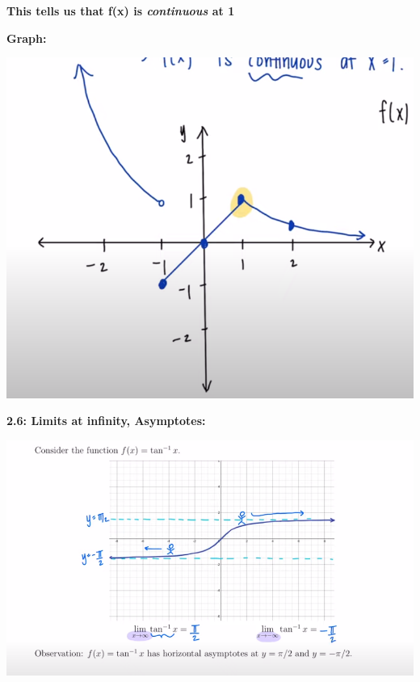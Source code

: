 \documentclass{report}
\begin{document}
        \bigbreak \noindent 
        \textbf{This tells us that f(x) is \textbf{\textit{continuous}} at \textbf{1}}

        \bigbreak \noindent \bigbreak \noindent 
        \begin{large}
            \textbf{Graph:}
        \end{large}

        \bigbreak \noindent \bigbreak \noindent 
        \begin{center}
            \includegraphics[scale=0.4]{../images/10.png}
        \end{center}


        \pagebreak \bigbreak \noindent
        \begin{Large}
            \textbf{2.6: Limits at infinity, Asymptotes:}
        \end{Large}

        \bigbreak \noindent \bigbreak \noindent \bigbreak \noindent 
        \begin{center}
            \includegraphics[scale=0.55]{../images/11.png}
        \end{center}
\end{document}
